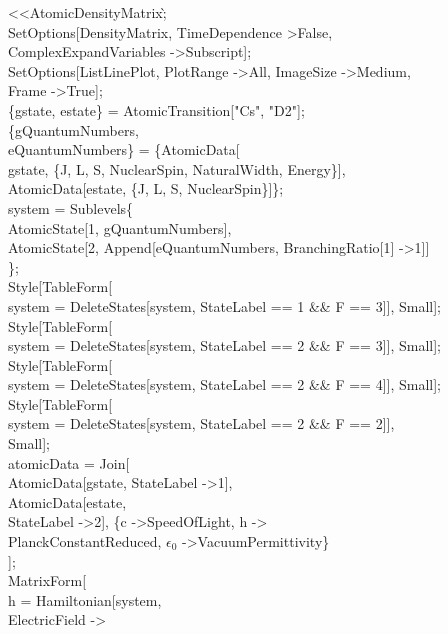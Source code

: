 \textless\textless AtomicDensityMatrix\`;\\
SetOptions[DensityMatrix, TimeDependence \textgreater False, \\
  ComplexExpandVariables -\textgreater Subscript];\\
SetOptions[ListLinePlot, PlotRange -\textgreater All, ImageSize -\textgreater Medium, \\
  Frame -\textgreater True];\\
\{gstate, estate\} = AtomicTransition["Cs", "D2"];\\
\{gQuantumNumbers, \\
   eQuantumNumbers\} = \{AtomicData[\\
    gstate, \{J, L, S, NuclearSpin, NaturalWidth, Energy\}],\\
   AtomicData[estate, \{J, L, S, NuclearSpin\}]\};\\
system = Sublevels\@\{\\
    AtomicState[1, gQuantumNumbers], \\
    AtomicState[2, Append[eQuantumNumbers, BranchingRatio[1] -\textgreater 1]]\\
    \};\\
Style[TableForm[\\
   system = DeleteStates[system, StateLabel == 1 \&\& F == 3]], Small];\\
Style[TableForm[\\
   system = DeleteStates[system, StateLabel == 2 \&\& F == 3]], Small];\\
Style[TableForm[\\
   system = DeleteStates[system, StateLabel == 2 \&\& F == 4]], Small];\\
Style[TableForm[\\
   system = DeleteStates[system, StateLabel == 2 \&\& F == 2]],\\
  Small];\\
atomicData = Join[\\
   AtomicData[gstate, StateLabel -\textgreater 1],\\
   AtomicData[estate, \\
    StateLabel -\textgreater 2], \{c -\textgreater SpeedOfLight, h -\textgreater \\
     PlanckConstantReduced, $\epsilon_0$ -\textgreater VacuumPermittivity\}\\
   ];\\
MatrixForm[\\
  h = Hamiltonian[system, \\
    ElectricField -\textgreater \\
